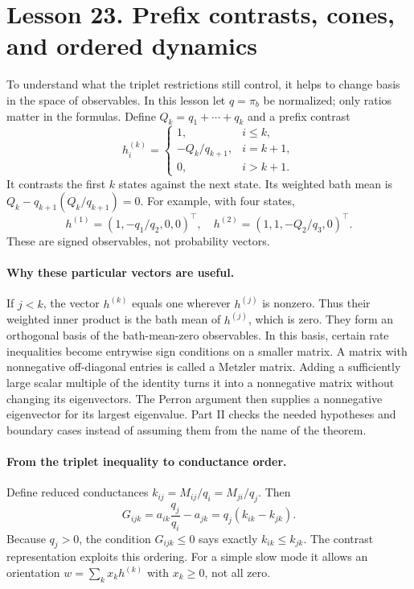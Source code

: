 \clearpage
\section*{Lesson 23. Prefix contrasts, cones, and ordered dynamics}
To understand what the triplet restrictions still control, it helps to
change basis in the space of observables. In this lesson let $q=\pi_b$ be
normalized; only ratios matter in the formulas. Define $Q_k=q_1+\cdots+q_k$
and a prefix contrast
\[
h^{(k)}_i=\begin{cases}
1,&i\leq k,\\
-Q_k/q_{k+1},&i=k+1,\\
0,&i>k+1.
\end{cases}
\]
It contrasts the first $k$ states against the next state. Its weighted
bath mean is $Q_k-q_{k+1}(Q_k/q_{k+1})=0$.
For example, with four states,
\[
h^{(1)}=(1,-q_1/q_2,0,0)^\top,\quad
h^{(2)}=(1,1,-Q_2/q_3,0)^\top.
\]
These are signed observables, not probability vectors.

\paragraph{Why these particular vectors are useful.}
If $j<k$, the vector $h^{(k)}$ equals one wherever $h^{(j)}$ is nonzero.
Thus their weighted inner product is the bath mean of $h^{(j)}$, which is
zero. They form an orthogonal basis of the bath-mean-zero observables.
In this basis, certain rate inequalities become entrywise sign conditions
on a smaller matrix. A matrix with nonnegative off-diagonal entries is
called a Metzler matrix. Adding a sufficiently large scalar multiple of
the identity turns it into a nonnegative matrix without changing its
eigenvectors. The Perron argument then supplies a nonnegative eigenvector
for its largest eigenvalue. Part II checks the needed hypotheses and
boundary cases instead of assuming them from the name of the theorem.

\paragraph{From the triplet inequality to conductance order.}
Define reduced conductances $k_{ij}=M_{ij}/q_i=M_{ji}/q_j$. Then
\[
G_{ijk}=a_{ik}\frac{q_j}{q_i}-a_{jk}
=q_j(k_{ik}-k_{jk}).
\]
Because $q_j>0$, the condition $G_{ijk}\leq0$ says exactly
$k_{ik}\leq k_{jk}$. The contrast representation exploits this ordering.
For a simple slow mode it allows an orientation
$w=\sum_k x_k h^{(k)}$ with $x_k\geq0$, not all zero.

